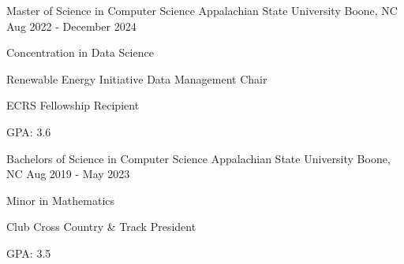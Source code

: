 

\begin{cventries}

  \cventry
    {Master of Science in Computer Science} %
    {Appalachian State University} %
    {Boone, NC} %
    {Aug 2022 - December 2024} %
    {
      \begin{cvitems} %
        \item {Concentration in Data Science}
        \item {Renewable Energy Initiative Data Management Chair}
        \item {ECRS Fellowship Recipient}
        \item {GPA: 3.6}
      \end{cvitems}
    }
    
  \cventry
    {Bachelors of Science in Computer Science} %
    {Appalachian State University} %
    {Boone, NC} %
    {Aug 2019 - May 2023} %
    {
      \begin{cvitems} %
        \item {Minor in Mathematics}
        \item {Club Cross Country \& Track President}
        \item {GPA: 3.5}
      \end{cvitems}
    }
\end{cventries}
